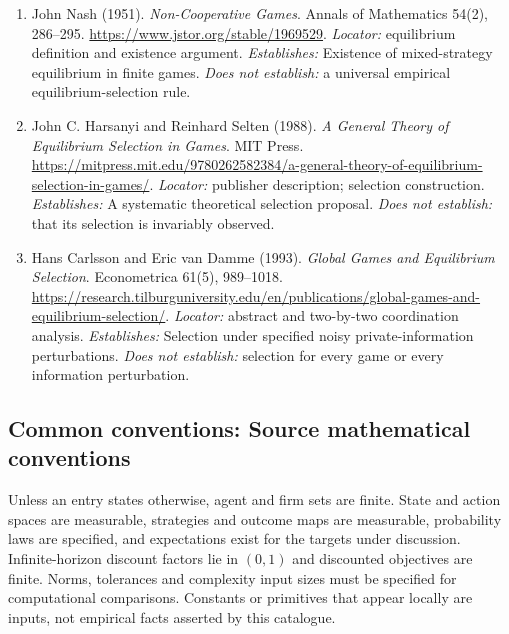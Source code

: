 \documentclass[11pt,a4paper]{article}
\begin{document}
\begin{enumerate}

\item[S1] John Nash (1951). \emph{Non-Cooperative Games}. Annals of Mathematics 54(2), 286--295. \url{https://www.jstor.org/stable/1969529}. \textit{Locator:} equilibrium definition and existence argument. \textit{Establishes:} Existence of mixed-strategy equilibrium in finite games. \textit{Does not establish:} a universal empirical equilibrium-selection rule.

\item[S2] John C. Harsanyi and Reinhard Selten (1988). \emph{A General Theory of Equilibrium Selection in Games}. MIT Press. \url{https://mitpress.mit.edu/9780262582384/a-general-theory-of-equilibrium-selection-in-games/}. \textit{Locator:} publisher description; selection construction. \textit{Establishes:} A systematic theoretical selection proposal. \textit{Does not establish:} that its selection is invariably observed.

\item[S3] Hans Carlsson and Eric van Damme (1993). \emph{Global Games and Equilibrium Selection}. Econometrica 61(5), 989--1018. \url{https://research.tilburguniversity.edu/en/publications/global-games-and-equilibrium-selection/}. \textit{Locator:} abstract and two-by-two coordination analysis. \textit{Establishes:} Selection under specified noisy private-information perturbations. \textit{Does not establish:} selection for every game or every information perturbation.

\end{enumerate}

\subsection*{Common conventions: Source mathematical conventions}

Unless an entry states otherwise, agent and firm sets are finite. State and action spaces are measurable, strategies and outcome maps are measurable, probability laws are specified, and expectations exist for the targets under discussion. Infinite-horizon discount factors lie in $(0,1)$ and discounted objectives are finite. Norms, tolerances and complexity input sizes must be specified for computational comparisons. Constants or primitives that appear locally are inputs, not empirical facts asserted by this catalogue.
\end{document}
